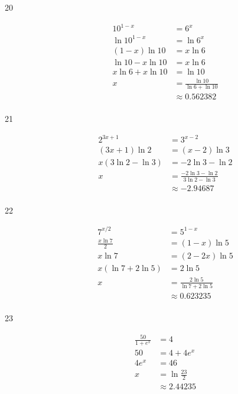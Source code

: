 \documentclass{exam}
\begin{document}
\begin{description}
      \item[20]
        \begin{align*}
          10^{1 - x}         &= 6^x \\
          \ln 10^{1 - x}     &= \ln 6^x \\
          (1 - x) \ln 10     &= x \ln 6 \\
          \ln 10 - x \ln 10  &= x \ln 6 \\
          x \ln 6 + x \ln 10 &= \ln 10 \\
          x                  &= \frac{\ln 10}{\ln 6 + \ln 10} \\
                             &\approx \boxed{0.562382} \\
        \end{align*}

      \item[21]
        \begin{align*}
          2^{3x + 1}          &= 3^{x - 2} \\
          (3x + 1) \ln 2      &= (x - 2) \ln 3 \\
          x (3 \ln 2 - \ln 3) &= - 2 \ln 3 - \ln 2 \\
          x                   &= \frac{ - 2 \ln 3 - \ln 2}{3 \ln 2 - \ln 3} \\
                              &\approx \boxed{-2.94687} \\
        \end{align*}

      \item[22]
        \begin{align*}
          7^{x/2}             &= 5^{1 - x} \\
          \frac{x \ln 7}{2}   &= (1 - x) \ln 5 \\
          x \ln 7             &= (2 - 2x) \ln 5 \\
          x (\ln 7 + 2 \ln 5) &= 2 \ln 5 \\
          x                   &= \frac{2 \ln 5}{\ln 7 + 2 \ln 5} \\
                              &\approx \boxed{0.623235} \\
        \end{align*}

      \item[23]
        \begin{align*}
          \frac{50}{1 + e^x} &= 4 \\
          50                 &= 4 + 4e^x \\
          4e^x               &= 46 \\
          x                  &= \ln \frac{23}{2} \\
                             &\approx \boxed{2.44235} \\
        \end{align*}


\end{description}
\end{document}

